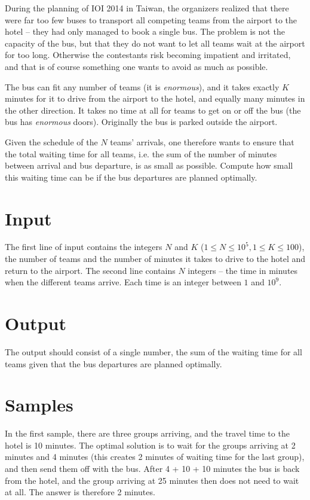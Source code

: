 
During the planning of IOI 2014 in Taiwan, the organizers realized that there were far too few buses to transport all competing teams from the airport to the hotel -- they had only managed to book a single bus. The problem is not the capacity of the bus, but that they do not want to let all teams wait at the airport for too long. Otherwise the contestants risk becoming impatient and irritated, and that is of course something one wants to avoid as much as possible.

The bus can fit any number of teams (it is \emph{enormous}), and it takes exactly $K$ minutes for it to drive from the airport to the hotel, and equally many minutes in the other direction. It takes no time at all for teams to get on or off the bus (the bus has \emph{enormous} doors). Originally the bus is parked outside the airport.

Given the schedule of the $N$ teams' arrivals, one therefore wants to ensure that the total waiting time for all teams, i.e. the sum of the number of minutes between arrival and bus departure, is as small as possible. Compute how small this waiting time can be if the bus departures are planned optimally.

\section*{Input}
The first line of input contains the integers $N$ and $K$ ($1 \leq N \leq 10^5, 1 \leq K \leq 100$), the number of teams and the number of minutes it takes to drive to the hotel and return to the airport.
The second line contains $N$ integers -- the time in minutes when the different teams arrive. Each time is an integer between $1$ and $10^9$.

\section*{Output}
The output should consist of a single number, the sum of the waiting time for all teams given that the bus departures are planned optimally.

\section*{Samples}
In the first sample, there are three groups arriving, and the travel time to the hotel is 10 minutes. The optimal solution is to wait for the groups arriving at 2 minutes and 4 minutes (this creates 2 minutes of waiting time for the last group), and then send them off with the bus. After 4 + 10 + 10 minutes the bus is back from the hotel, and the group arriving at 25 minutes then does not need to wait at all. The answer is therefore 2 minutes.


